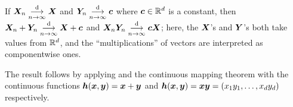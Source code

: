 \begin{enumerate}
\begin{theorem}
\label{thm:slutsky}
If \(\bm{X}_n\underset{n\to\infty}{\overset{\text{d}}{\longrightarrow}}\bm{X}\) and \(\bm{Y}_n\underset{n\to\infty}{\overset{\text{d}}{\longrightarrow}}\bm{c}\) where
\(\bm{c}\in\mathbb{R}^d\) is a constant, then \(\bm{X}_n+\bm{Y}_n\underset{n\to\infty}{\overset{\text{d}}{\longrightarrow}}
\bm{X}+\bm{c}\) and \(\bm{X}_n\bm{Y}_n\underset{n\to\infty}{\overset{\text{d}}{\longrightarrow}} \bm{c}\bm{X}\); here,
the \(\bm{X}\)'s and \(\bm{Y}\)'s both take values from \(\mathbb{R}^d\), and the
``multiplications'' of vectors are interpreted as componentwise ones.
\end{theorem}
\begin{pf}
The result follows by applying  and the continuous
mapping theorem with the continuous functions
\(\bm{h}(\bm{x},\bm{y})=\bm{x}+\bm{y}\) and
\(\bm{h}(\bm{x},\bm{y})=\bm{x}\bm{y}=(x_1y_1,\dotsc,x_dy_d)\)
respectively.
\end{pf}
\end{enumerate}
